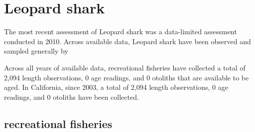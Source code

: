 \documentclass[11pt,
  english,
  letterpaper,
]{article}
\begin{document}
\hypertarget{leopard-shark}{%
\section{Leopard shark}\label{leopard-shark}}

\leavevmode\tagmcend\tagstructend


The most recent assessment of Leopard shark was a data-limited assessment conducted in 2010. Across available data, Leopard shark have been observed and sampled generally by

\leavevmode\tagmcend\tagstructend\par


Across all years of available data, recreational fisheries have collected a total of 2,094 length observations, 0 age readings, and 0 otoliths that are available to be aged. In California, since 2003, a total of 2,094 length observations, 0 age readings, and 0 otoliths have been collected.

\leavevmode\tagmcend\tagstructend\par


\hypertarget{recreational-fisheries-20}{%
\subsection{recreational fisheries}\label{recreational-fisheries-20}}

\leavevmode\tagmcend\tagstructend


\begingroup\fontsize{10}{12}\selectfont \begingroup\fontsize{10}{12}\selectfont

\leavevmode\tagmcend\tagstructend\par
\end{document}

